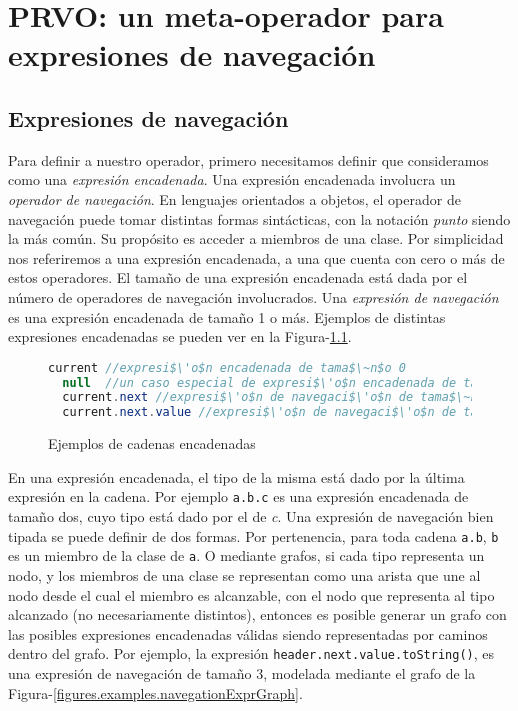 \chapter[PRVO]{PRVO: un meta-operador para expresiones de navegaci\'on}
\label{sec:prvo}

\section{Expresiones de navegaci\'on}
\label{sec:prvo.navigationalExpressions}

Para definir a nuestro operador, primero necesitamos definir que consideramos como una \emph{expresi\'on encadenada}. Una expresi\'on encadenada involucra un \emph{operador de navegaci\'on}. En lenguajes orientados a objetos, el operador de navegaci\'on puede tomar distintas formas sint\'acticas, con la notaci\'on \emph{punto} siendo la m\'as com\'un. Su prop\'osito es acceder a miembros de una clase. Por simplicidad nos referiremos a una expresi\'on encadenada, a una que cuenta con cero o m\'as de estos operadores. El tama\~no de una expresi\'on encadenada est\'a dada por el n\'umero de operadores de navegaci\'on involucrados. Una \emph{expresi\'on de navegaci\'on} es una expresi\'on encadenada de tama\~no 1 o m\'as. Ejemplos de distintas expresiones encadenadas se pueden ver en la Figura-\ref{figures.examples.chainedExpr}.

\begin{figure}
	\begin{lstlisting}[mathescape=true, language=Java, extendedchars=true]
  current //expresi$\'o$n encadenada de tama$\~n$o 0
  null 	//un caso especial de expresi$\'o$n encadenada de tama$\~n$o 0
  current.next //expresi$\'o$n de navegaci$\'o$n de tama$\~n$o 1
  current.next.value //expresi$\'o$n de navegaci$\'o$n de tama$\~n$o 2
	\end{lstlisting}
	\caption{Ejemplos de cadenas encadenadas}
	\label{figures.examples.chainedExpr}
\end{figure}

En una expresi\'on encadenada, el tipo de la misma est\'a dado por la \'ultima expresi\'on en la cadena. Por ejemplo \lstinline|a.b.c| es una expresi\'on encadenada de tama\~no dos, cuyo tipo est\'a dado por el de \emph{c}. Una expresi\'on de navegaci\'on bien tipada se puede definir de dos formas. Por pertenencia, para toda cadena \texttt{a.b}, \texttt{b} es un miembro de la clase de \texttt{a}. O mediante grafos, si cada tipo representa un nodo, y los miembros de una clase se representan como una arista que une al nodo desde el cual el miembro es alcanzable, con el nodo que representa al tipo alcanzado (no necesariamente distintos), entonces es posible generar un grafo con las posibles expresiones encadenadas v\'alidas siendo representadas por caminos dentro del grafo. Por ejemplo, la expresi\'on \lstinline|header.next.value.toString()|, es una expresi\'on de navegaci\'on de tama\~no 3, modelada mediante el grafo de la Figura-\ref{figures.examples.navegationExprGraph}.


